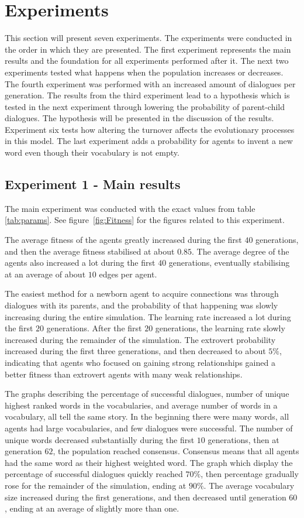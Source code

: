 \section{Experiments}
This section will present seven experiments. The experiments were conducted in the order in which they are presented. The first experiment represents the main results and the foundation for all experiments performed after it. The next two experiments tested what happens when the population increases or decreases. The fourth experiment was performed with an increased amount of dialogues per generation. The results from the third experiment lead to a hypothesis which is tested in the next experiment through lowering the probability of parent-child dialogues. The hypothesis will be presented in the discussion of the results. Experiment six tests how altering the turnover affects the evolutionary processes in this model. The last experiment adds a probability for agents to invent a new word even though their vocabulary is not empty.

\subsection{Experiment 1 - Main results}
The main experiment was conducted with the exact values from table \ref{tab:params}. See figure~\ref{fig:Fitness} for the figures related to this experiment.

The average fitness of the agents greatly increased during the first $40$ generations, and then the average fitness stabilised at about $0.85$. The average degree of the agents also increased a lot during the first $40$ generations, eventually stabilising at an average of about $10$ edges per agent. 

The easiest method for a newborn agent to acquire connections was through dialogues with its parents, and the probability of that happening was slowly increasing during the entire simulation. The learning rate increased a lot during the first $20$ generations. After the first $20$ generations, the learning rate slowly increased during the remainder of the simulation. The extrovert probability increased during the first three generations, and then decreased to about $5\%$, indicating that agents who focused on gaining strong relationships gained a better fitness than extrovert agents with many weak relationships. 

The graphs describing the percentage of successful dialogues, number of unique highest ranked words in the vocabularies, and average number of words in a vocabulary, all tell the same story. In the beginning there were many words, all agents had large vocabularies, and few dialogues were successful. The number of unique words decreased substantially during the first $10$ generations, then at generation $62$, the population reached consensus. Consensus means that all agents had the same word as their highest weighted word. The graph which display the percentage of successful dialogues quickly reached $70\%$, then percentage gradually rose for the remainder of the simulation, ending at $90\%$. The average vocabulary size increased during the first generations, and then decreased until generation $60$, ending at an average of slightly more than one.


